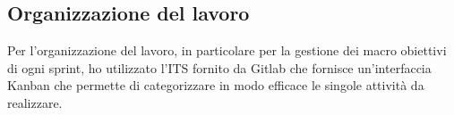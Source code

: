 \subsection{Organizzazione del lavoro}
Per l'organizzazione del lavoro, in particolare per la gestione dei macro obiettivi di ogni sprint, ho utilizzato l'ITS fornito da Gitlab che fornisce un'interfaccia Kanban che permette di categorizzare in modo efficace le singole attività da realizzare.
























